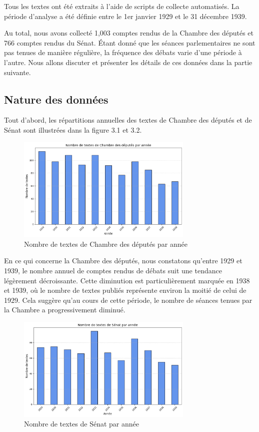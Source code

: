 \documentclass[a4paper,twoside,12pt]{book}
\begin{document}
Tous les textes ont été extraits à l'aide de scripts de collecte automatisés. La période d'analyse a été définie entre le 1er janvier 1929 et le 31 décembre 1939.

Au total, nous avons collecté 1,003 comptes rendus de la Chambre des députés et 766 comptes rendus du Sénat. Étant donné que les séances parlementaires ne sont pas tenues de manière régulière, la fréquence des débats varie d'une période à l'autre. Nous allons discuter et présenter les détails de ces données dans la partie suivante.


\subsection{Nature des données}

Tout d'abord, les répartitions annuelles des textes de Chambre des députés et de Sénat sont illustrées dans la figure 3.1 et 3.2.

\begin{figure}
\centering %
\includegraphics[width=0.75\textwidth]{img/dc.png}
\caption{Nombre de textes de Chambre des députés par année}
\end{figure}

En ce qui concerne la Chambre des députés, nous constatons qu'entre 1929 et 1939, le nombre annuel de comptes rendus de débats suit une tendance légèrement décroissante. Cette diminution est particulièrement marquée en 1938 et 1939, où le nombre de textes publiés représente environ la moitié de celui de 1929. Cela suggère qu'au cours de cette période, le nombre de séances tenues par la Chambre a progressivement diminué.

\begin{figure}
\centering %
\includegraphics[width=0.75\textwidth]{img/ds.png}
\caption{Nombre de textes de Sénat par année}
\end{figure}
\end{document}
